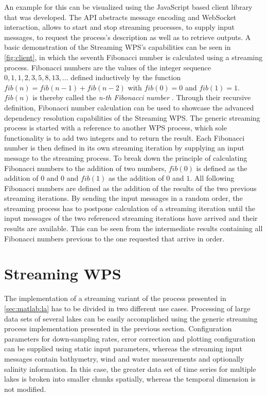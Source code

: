   An example for this can be visualized using the JavaScript based client library that was developed. The \acs{API} abstracts message encoding and WebSocket interaction, allows to start and stop streaming processes, to supply input messages, to request the process's description as well as to retrieve outputs. A basic demonstration of the Streaming WPS's capabilities can be seen in \cref{fig:client}, in which the seventh Fibonacci number is calculated using a streaming process. Fibonacci numbers are the values of the integer sequence $0, 1, 1, 2, 3, 5, 8, 13, \dots$ defined inductively by the function $fib(n) = fib(n-1) + fib(n-2)$ with $fib(0) = 0$ and $fib(1) = 1$. $fib(n)$ is thereby called the \emph{n-th Fibonacci number} \citep{fibonacci}. Through their recursive definition, Fibonacci number calculation can be used to showcase the advanced dependency resolution capabilities of the Streaming WPS. The generic streaming process is started with a reference to another WPS process, which sole functionality is to add two integers and to return the result. Each Fibonacci number is then defined in its own streaming iteration by supplying an input message to the streaming process. To break down the principle of calculating Fibonacci numbers to the addition of two numbers, $fib(0)$ is defined as the addition of $0$ and $0$ and $fib(1)$ as the addition of $0$ and $1$. All following Fibonacci numbers are defined as the addition of the results of the two previous streaming iterations. By sending the input messages in a random order, the streaming process has to postpone calculation of a streaming iteration until the input messages of the two referenced streaming iterations have arrived and their results are available. This can be seen from the intermediate results containing all Fibonacci numbers previous to the one requested that arrive in order.

\section{Streaming \la WPS}
  The implementation of a streaming variant of the \la process presented in \cref{sec:matlab:la} has to be divided in two different use cases. Processing of large data sets of several lakes can be easily accomplished using the generic streaming process implementation presented in the previous section. Configuration parameters for down-sampling rates, error correction and plotting configuration can be supplied using static input parameters, whereas the streaming input messages contain bathymetry, wind and water measurements and optionally salinity information. In this case, the greater data set of time series for multiple lakes is broken into smaller chunks spatially, whereas the temporal dimension is not modified.

